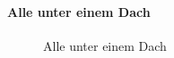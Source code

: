 \documentclass[
  letterpaper,
  DIV=11,
  numbers=noendperiod,
  landscape,
  a4paper,
  geometry:margin=1in]{scrartcl}
\let\oldparagraph\paragraph
\renewcommand{\paragraph}[1]{\oldparagraph{#1}\mbox{}}
\begin{document}
\paragraph{Alle unter einem Dach}\label{alle-unter-einem-dach}

\begin{figure}


\caption{\label{fig-alle-unter-einem-dach}Alle unter einem Dach}

\end{figure}%
\end{document}
